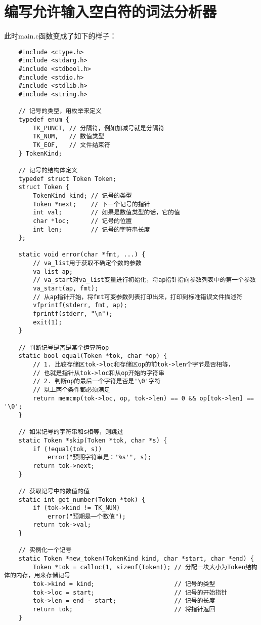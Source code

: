 \documentclass[cn,10pt,math=newtx,citestyle=gb7714-2015,bibstyle=gb7714-2015]{elegantbook}
\begin{document}
\chapter{编写允许输入空白符的词法分析器}

此时main.c函数变成了如下的样子：

\begin{verbatim}
    #include <ctype.h>
    #include <stdarg.h>
    #include <stdbool.h>
    #include <stdio.h>
    #include <stdlib.h>
    #include <string.h>

    // 记号的类型，用枚举来定义
    typedef enum {
        TK_PUNCT, // 分隔符，例如加减号就是分隔符
        TK_NUM,   // 数值类型
        TK_EOF,   // 文件结束符
    } TokenKind;

    // 记号的结构体定义
    typedef struct Token Token;
    struct Token {
        TokenKind kind; // 记号的类型
        Token *next;    // 下一个记号的指针
        int val;        // 如果是数值类型的话，它的值
        char *loc;      // 记号的位置
        int len;        // 记号的字符串长度
    };

    static void error(char *fmt, ...) {
        // va_list用于获取不确定个数的参数
        va_list ap;
        // va_start对va_list变量进行初始化，将ap指针指向参数列表中的第一个参数
        va_start(ap, fmt);
        // 从ap指针开始，将fmt可变参数列表打印出来，打印到标准错误文件描述符
        vfprintf(stderr, fmt, ap);
        fprintf(stderr, "\n");
        exit(1);
    }

    // 判断记号是否是某个运算符op
    static bool equal(Token *tok, char *op) {
        // 1. 比较存储区tok->loc和存储区op的前tok->len个字节是否相等，
        // 也就是指针从tok->loc和从op开始的字符串
        // 2. 判断op的最后一个字符是否是'\0'字符
        // 以上两个条件都必须满足
        return memcmp(tok->loc, op, tok->len) == 0 && op[tok->len] == '\0';
    }

    // 如果记号的字符串和s相等，则跳过
    static Token *skip(Token *tok, char *s) {
        if (!equal(tok, s))
            error("预期字符串是：'%s'", s);
        return tok->next;
    }

    // 获取记号中的数值的值
    static int get_number(Token *tok) {
        if (tok->kind != TK_NUM)
            error("预期是一个数值");
        return tok->val;
    }

    // 实例化一个记号
    static Token *new_token(TokenKind kind, char *start, char *end) {
        Token *tok = calloc(1, sizeof(Token)); // 分配一块大小为Token结构体的内存，用来存储记号
        tok->kind = kind;                      // 记号的类型
        tok->loc = start;                      // 记号的开始指针
        tok->len = end - start;                // 记号的长度
        return tok;                            // 将指针返回
    }


\end{verbatim}
\end{document}
